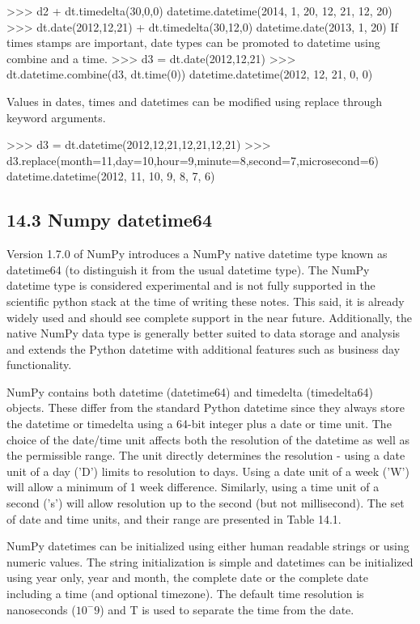 \documentclass[11pt]{article} %
\begin{document}
>>> d2 + dt.timedelta(30,0,0)
datetime.datetime(2014, 1, 20, 12, 21, 12, 20)
>>> dt.date(2012,12,21) + dt.timedelta(30,12,0)
datetime.date(2013, 1, 20)
If times stamps are important, date types can be promoted to datetime using combine and a time.
>>> d3 = dt.date(2012,12,21)
>>> dt.datetime.combine(d3, dt.time(0))
datetime.datetime(2012, 12, 21, 0, 0)

Values in dates, times and datetimes can be modified using replace through keyword arguments.

>>> d3 = dt.datetime(2012,12,21,12,21,12,21)
>>> d3.replace(month=11,day=10,hour=9,minute=8,second=7,microsecond=6)
datetime.datetime(2012, 11, 10, 9, 8, 7, 6)
\newpage
\subsection{14.3 Numpy datetime64}
Version 1.7.0 of NumPy introduces a NumPy native datetime type known as datetime64 (to distinguish it
from the usual datetime type). The NumPy datetime type is considered experimental and is not fully supported
in the scientific python stack at the time of writing these notes. This said, it is already widely used
and should see complete support in the near future. Additionally, the native NumPy data type is generally
better suited to data storage and analysis and extends the Python datetime with additional features such
as business day functionality.

NumPy contains both datetime (datetime64) and timedelta (timedelta64) objects. These differ from
the standard Python datetime since they always store the datetime or timedelta using a 64-bit integer plus
a date or time unit. The choice of the date/time unit affects both the resolution of the datetime as well
as the permissible range. The unit directly determines the resolution - using a date unit of a day (’D’)
limits to resolution to days. Using a date unit of a week (’W’) will allow a minimum of 1 week difference.
Similarly, using a time unit of a second (’s’) will allow resolution up to the second (but not millisecond).
The set of date and time units, and their range are presented in Table 14.1.

NumPy datetimes can be initialized using either human readable strings or using numeric values. The
string initialization is simple and datetimes can be initialized using year only, year and month, the complete
date or the complete date including a time (and optional timezone). The default time resolution is
nanoseconds ($10^-9$) and T is used to separate the time from the date.
\end{document}
